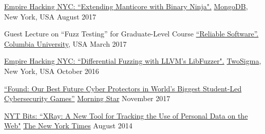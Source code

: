

\vspace{0.025in}
\begin{cvhonorswide2}
\cvhonorwide
    {}
    {\href{https://www.meetup.com/Empire-Hacking/events/239192018}{Empire
            Hacking NYC: ``Extending Manticore with Binary Ninja".}}
    {\href{https://www.mongodb.com/}{MongoDB}, New York, USA}
    {August 2017}
\end{cvhonorswide2}

\vspace{0.025in}
\begin{cvhonorswide2}
\cvhonorwide
    {}
    {Guest Lecture on ``Fuzz Testing'' for Graduate-Level Course \href{http://www.cs.columbia.edu/~junfeng/18sp-e6121/syllabus.html}{``Reliable Software''.}}
    {\href{http://www.cs.columbia.edu/}{Columbia University}, USA}
    {March 2017}
\end{cvhonorswide2}

\vspace{0.025in}
\begin{cvhonorswide2}
  \cvhonorwide
    {}
    {\href{https://www.meetup.com/Empire-Hacking/events/231863227/?_af=event&_af_eid=231863227&https=on}{Empire
            Hacking NYC: ``Differential Fuzzing with LLVM's LibFuzzer".}}
    {\href{https://www.twosigma.com/}{TwoSigma}, New York, USA}
    {October 2016}
\end{cvhonorswide2}

\vspace{0.025in}

\vspace{0.025in}
\begin{cvhonorswide2}
  \cvhonorwide
    {}
    {\href{https://www.morningstar.com/news/pr-news-wire/PRNews_20171114DC44382/found-our-best-future-cyber-protectors-in-worlds-biggest-studentled-cybersecurity-games.print.html}{\footnotesize``Found:
    Our Best Future Cyber Protectors
    in World's Biggest Student-Led Cybersecurity Games''}}
    {\href{https://www.morningstar.com}{Morning Star}}
    {November 2017}
\end{cvhonorswide2}
\vspace{0.025in}

\begin{cvhonorswide2}
  \cvhonorwide
    {}
    {\href{http://bits.blogs.nytimes.com/2014/08/18/xray-a-new-tool-for-tracking-the-use-of-personal-data-on-the-web/}{NYT Bits:
    ``XRay: A New Tool for Tracking the Use of Personal Data on the Web"}}
    {\href{http://www.nytimes.com/}{The New York Times}}
    {August 2014}
\end{cvhonorswide2}

